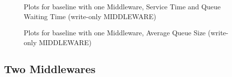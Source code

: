 \documentclass[11pt,a4paper]{article}
\begin{document}
\begin{figure}[!h]
  \centering
  \caption{Plots for baseline with one Middleware, Service Time and Queue Waiting Time (write-only MIDDLEWARE)}
  \label{fig:baseline_mw_1_mw_mw_c_wo}
\end{figure}

\begin{figure}[!h]
  \centering
    \caption{Plots for baseline with one Middleware, Average Queue Size (write-only MIDDLEWARE)}
  \label{fig:baseline_mw_1_mw_mw_qs_wo}
\end{figure}

\subsection{Two Middlewares}
\end{document}
